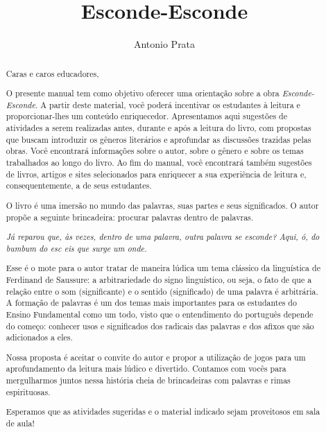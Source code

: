\documentclass[11pt]{extarticle}
\newcommand{\AutorLivro}{Antonio Prata}
\newcommand{\TituloLivro}{Esconde-Esconde}
\newcommand{\colaborador}{Gabriela Karam}
\begin{document}
\title{\TituloLivro}
\author{\AutorLivro}
\def\authornotes{\colaborador}

\date{}
\maketitle


\tableofcontents


\begin{abstract}

Caras e caros educadores,

O presente manual tem como objetivo oferecer uma orientação sobre a obra \textit{Esconde-Esconde}. A partir deste material, você poderá incentivar os estudantes à leitura e proporcionar-lhes um conteúdo enriquecedor. Apresentamos aqui sugestões de atividades a serem realizadas antes, durante e após a leitura do livro, com propostas que buscam introduzir os gêneros literários e aprofundar as discussões trazidas pelas obras. Você encontrará informações sobre o autor, sobre o gênero e sobre os temas trabalhados ao longo do livro. Ao fim do manual, você encontrará também sugestões de livros, artigos e sites selecionados para enriquecer a sua experiência de leitura e, consequentemente, a de seus estudantes.


O livro é uma imersão no mundo das palavras, suas partes e seus significados. O autor propõe a seguinte brincadeira: procurar palavras dentro de palavras.

\textit{Já reparou que, às vezes, dentro de uma palavra, outra palavra se esconde? Aqui, ó, do bumbum do esc eis que surge um onde.}

Esse é o mote para o autor tratar de maneira lúdica um tema clássico da linguística de Ferdinand de Saussure: a arbitrariedade do signo linguístico, ou seja, o fato de que a relação entre o som (significante) e o sentido (significado) de uma palavra é arbitrária. A formação de palavras é um dos temas mais importantes para os estudantes do Ensino Fundamental como um todo, visto que o entendimento do português depende do começo: conhecer usos e significados dos radicais das palavras e dos afixos que são adicionados a eles. 

Nossa proposta é aceitar o convite do autor e propor a utilização de jogos para um aprofundamento da leitura mais lúdico e divertido. Contamos com vocês para mergulharmos juntos nessa história cheia de brincadeiras com palavras e rimas espirituosas. 

Esperamos que as atividades sugeridas e o material indicado sejam proveitosos em sala de aula! 

\end{abstract}
\end{document}

